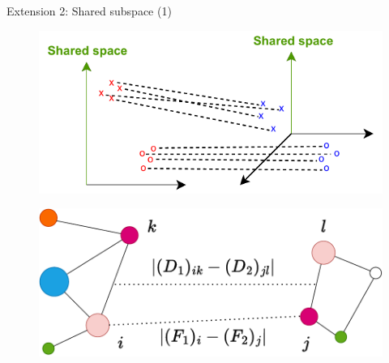 \documentclass{beamer}
\begin{document}
\begin{frame}{Extension 2: Shared subspace (1)}
  \begin{figure}
    \centering
    \includegraphics[width=0.8\linewidth, keepaspectratio=true]{OT_new/fgw_abstract2.pdf}
  \end{figure}

  \begin{figure}
    \centering
    \includegraphics[width=0.7\linewidth, keepaspectratio=true]{OT_new/fgw.pdf}
  \end{figure}
\end{frame}
\end{document}
